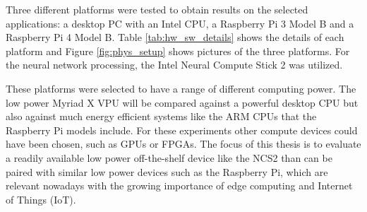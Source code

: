 Three different platforms were tested to obtain results on the selected applications: a desktop PC with an Intel CPU, a Raspberry Pi 3 Model B and a Raspberry Pi 4 Model B. Table \ref{tab:hw_sw_details} shows the details of each platform and Figure \ref{fig:phys_setup} shows pictures of the three platforms. For the neural network processing, the Intel Neural Compute Stick 2 was utilized.

These platforms were selected to have a range of different computing power. The low power Myriad X VPU will be compared against a powerful desktop CPU but also against much energy efficient systems like the ARM CPUs that the Raspberry Pi models include. For these experiments other compute devices could have been chosen, such as GPUs or FPGAs. The focus of this thesis is to evaluate a readily available low power off-the-shelf device like the NCS2 than can be paired with similar low power devices such as the Raspberry Pi, which are relevant nowadays with the growing importance of edge computing and Internet of Things (IoT).

